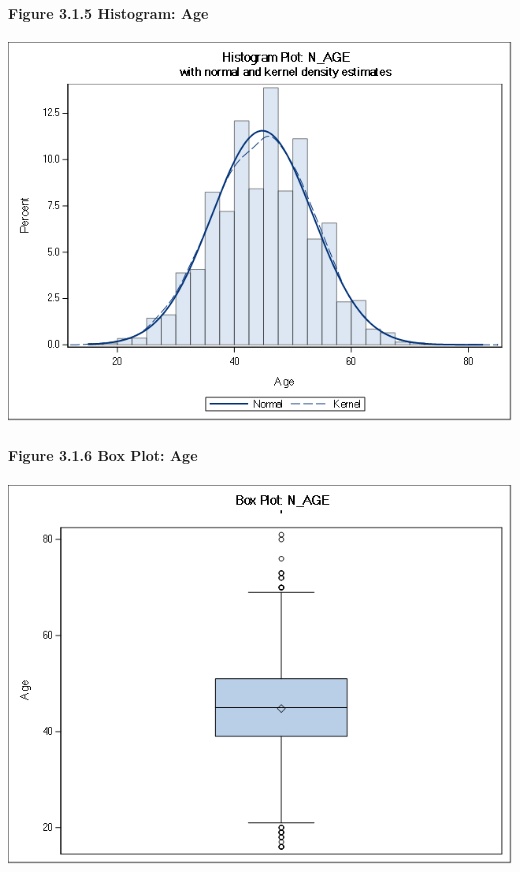 \documentclass[]{article}
\let\oldparagraph\paragraph
\renewcommand{\paragraph}[1]{\oldparagraph{#1}\mbox{}}
\begin{document}
\newpage

\paragraph{Figure 3.1.5 Histogram:
Age}\label{figure-3.1.5-histogram-age}

\includegraphics[height=3.95833in]{images/hist_age.png}

\paragraph{Figure 3.1.6 Box Plot: Age}\label{figure-3.1.6-box-plot-age}

\includegraphics[height=3.95833in]{images/box_age.png}
\end{document}
